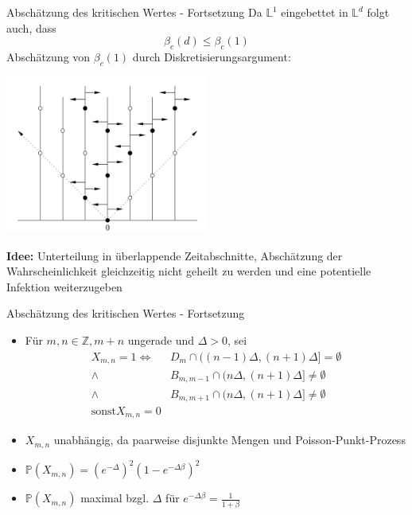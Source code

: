 \documentclass[11pt]{beamer}
\begin{document}
\begin{frame}{Absch\"atzung des kritischen Wertes - Fortsetzung}
    Da $\mathbb{L}^1$ eingebettet in $\mathbb{L}^d$ folgt auch, dass 
    \begin{equation*}
        \beta_c(d) \leq \beta_c(1)
    \end{equation*}
    Absch\"atzung von $\beta_c(1)$ durch Diskretisierungsargument:
    \begin{center}
        \includegraphics[width=0.5\textwidth]{images/contact process discretization.png}
    \end{center}
    \textbf{Idee:} Unterteilung in \"uberlappende Zeitabschnitte, Absch\"atzung der Wahrscheinlichkeit
    gleichzeitig nicht geheilt zu werden und eine potentielle Infektion weiterzugeben
\end{frame}
\begin{frame}{Absch\"atzung des kritischen Wertes - Fortsetzung}
    \begin{itemize}
        \item F\"ur $m, n \in \mathbb{Z}, m + n$ ungerade und $\Delta > 0$, sei
            \begin{align*}
            X_{m, n} = 1 \iff &D_m \cap ((n - 1)\Delta, (n + 1)\Delta] = \emptyset\\
                \wedge &B_{m, m - 1} \cap (n\Delta, (n + 1)\Delta] \not = \emptyset\\
                \wedge &B_{m, m + 1} \cap (n\Delta, (n + 1)\Delta] \not = \emptyset\\
                \text{sonst} X_{m, n} = 0
            \end{align*}
        \item $X_{m, n}$ unabh\"angig, da paarweise disjunkte Mengen und Poisson-Punkt-Prozess
        \item $\mathbb{P}(X_{m, n}) = (e^{-\Delta})^2 (1 - e^{-\Delta \beta})^2$
        \item $\mathbb{P}(X_{m, n})$ maximal bzgl. $\Delta$ f\"ur $e^{-\Delta \beta} = \frac{1}{1 + \beta}$
    \end{itemize}
\end{frame}
\end{document}
